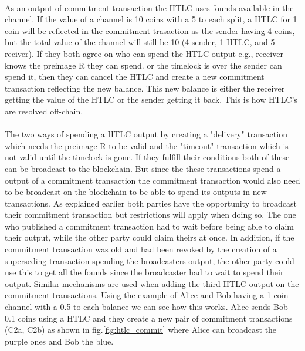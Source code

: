 \documentclass[informationsecurity]{gucmasterproject}
\begin{document}
\paragraph{}
As an output of commitment transaction the HTLC uses founds available in the channel. If the value of a channel is 10 coins with a 5 to each split, a HTLC for 1 coin will be reflected in the commitment trasaction as the sender having 4 coins, but the total value of the channel will still be 10 (4 sender, 1 HTLC, and 5 reciver). If they both agree on who can spend the HTLC output-e.g., receiver knows the preimage R they can spend. or the timelock is over the sender can spend it, then they can cancel the HTLC and create a new commitment transaction reflecting the new balance. This new balance is either the receiver getting the value of the HTLC or the sender getting it back. This is how HTLC's are resolved off-chain.

\paragraph{}
The two ways of spending a HTLC output by creating a "delivery" transaction which needs the preimage R to be valid and the "timeout" transaction which is not valid until the timelock is gone. If they fulfill their conditions both of these can be broadcast to the blockchain. But since the these transactions spend a output of a commitment transaction the commitment transaction would also need to be broadcast on the blockchain to be able to spend its outputs in new transactions. As explained earlier both parties have the opportunity to broadcast their commitment transaction but restrictions will apply when doing so. The one who published a commitment transaction had to wait before being able to claim their output, while the other party could claim theirs at once. In addition, if the commitment transaction was old and had been revoked by the creation of a superseding transaction spending the
broadcasters output, the other party could use this to get all the founds since the broadcaster had to wait to spend their output.
Similar mechanisms are used when adding the third HTLC output on the commitment transactions. Using the example of Alice and Bob having a 1 coin channel with a 0.5 to each balance we can see how this works. Alice sends Bob 0.1 coins using a HTLC and they create a new pair of commitment transactions (C2a, C2b) as shown in fig.\ref{fig:htlc_commit} where Alice can broadcast the purple ones and Bob the blue.
\end{document}
